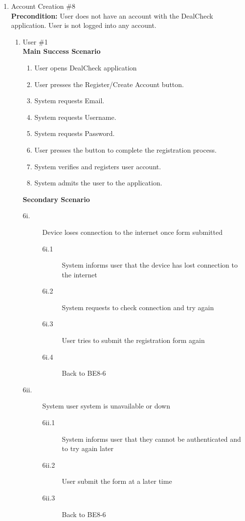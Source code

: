 \documentclass[]{article}
\begin{document}
\begin{enumerate}
\begin{enumerate}[{\bf {BE}1.}]
\item Account Creation \#8 \\
{\bf Precondition:} User does not have an account with the DealCheck application. User is not logged into any account.
\begin{enumerate}[{\bf VP1.}]
    \item User \#1 \\
    {\bf Main Success Scenario}
    \begin{enumerate}[1.]
        \item User opens DealCheck application
        \item User presses the Register/Create Account button.
        \item System requests Email.
        \item System requests Username.
        \item System requests Password.
        \item User presses the button to complete the registration process.
        \item System verifies and registers user account.
        \item System admits the user to the application.
        
    \end{enumerate}
    {\bf Secondary Scenario} \\
	\begin{description}
		\item [6i.] Device loses connection to the internet once form submitted
		\begin{description}
			\item [6i.1] System informs user that the device has lost connection to the internet
			\item [6i.2] System requests to check connection and try again
			\item [6i.3] User tries to submit the registration form again
			\item [6i.4] Back to BE8-6
		\end{description}

		\item [6ii.] System user system is unavailable or down
		\begin{description}
			\item [6ii.1] System informs user that they cannot be authenticated and to try again later
			\item [6ii.2] User submit the form at a later time
			\item [6ii.3] Back to BE8-6
		\end{description}


\end{description}
\end{enumerate}
\end{enumerate}
\end{enumerate}
\end{document}
